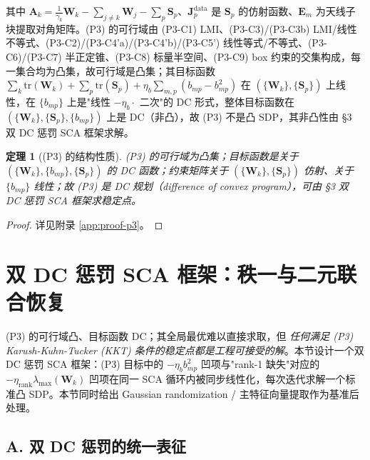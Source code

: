 \documentclass[12pt,a4paper]{article}
\newtheorem{theorem}{定理}
\newcommand{\mat}[1]{\mathbf{#1}}
\newcommand{\tr}{\text{tr}}
\begin{document}
其中 $\mat{A}_k = \frac{1}{\gamma_k} \mat{W}_k - \sum_{j \neq k} \mat{W}_j - \sum_{p} \mat{S}_p$、$\mat{J}_p^{\text{data}}$ 是 $\mat{S}_p$ 的仿射函数、$\mat{E}_m$ 为天线子块提取对角矩阵。(P3) 的可行域由 (P3-C1) LMI、(P3-C3)/(P3-C3b) LMI/线性不等式、(P3-C2)/(P3-C4'a)/(P3-C4'b)/(P3-C5') 线性等式/不等式、(P3-C6)/(P3-C7) 半正定锥、(P3-C8) 标量半空间、(P3-C9) box 约束的交集构成，每一集合均为凸集，故可行域是凸集；其目标函数 $\sum_k \tr(\mat{W}_k) + \sum_p \tr(\mat{S}_p) + \eta_b \sum_{m,p} (b_{mp} - b_{mp}^2)$ 在 $(\{\mat{W}_k\}, \{\mat{S}_p\})$ 上线性，在 $\{b_{mp}\}$ 上是"线性 $-\eta_b \cdot$ 二次"的 DC 形式，整体目标函数在 $(\{\mat{W}_k\}, \{\mat{S}_p\}, \{b_{mp}\})$ 上是 DC（非凸），故 (P3) 不是凸 SDP，其非凸性由 §3 双 DC 惩罚 SCA 框架求解。

\begin{theorem}[(P3) 的结构性质]\label{thm:p3-structure}
(P3) 的可行域为凸集；目标函数是关于 $(\{\mat{W}_k\}, \{b_{mp}\}, \{\mat{S}_p\})$ 的 DC 函数；约束矩阵关于 $(\{\mat{W}_k\}, \{\mat{S}_p\})$ 仿射、关于 $\{b_{mp}\}$ 线性；故 (P3) 是 DC 规划（difference of convex program），可由 \S3 双 DC 惩罚 SCA 框架求稳定点。
\end{theorem}

\begin{proof}
详见附录 \ref{app:proof-p3}。
\end{proof}

\section{双 DC 惩罚 SCA 框架：秩一与二元联合恢复}\label{sec:sca}

(P3) 的可行域凸、目标函数 DC；其全局最优难以直接求取，但 \emph{任何满足 (P3) Karush-Kuhn-Tucker (KKT) 条件的稳定点都是工程可接受的解}。本节设计一个双 DC 惩罚 SCA 框架：(P3) 目标中的 $-\eta_b b_{mp}^2$ 凹项与"rank-1 缺失"对应的 $-\eta_{\text{rank}} \lambda_{\max}(\mat{W}_k)$ 凹项在同一 SCA 循环内被同步线性化，每次迭代求解一个标准凸 SDP。本节同时给出 Gaussian randomization / 主特征向量提取作为基准后处理。

\subsection*{A. 双 DC 惩罚的统一表征}
\end{document}
